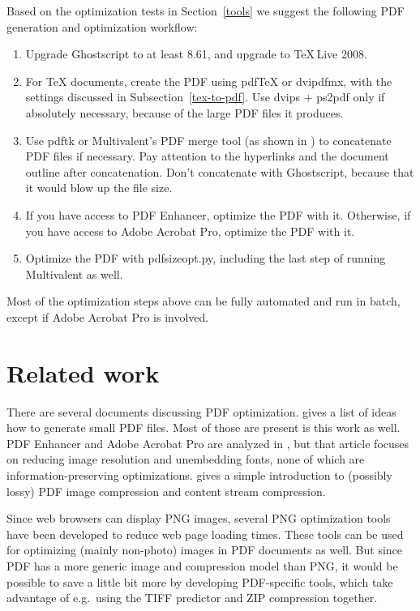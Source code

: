 \documentclass{ltugproc}
\def\cmd{\textsf}
\begin{document}
Based on the optimization tests in Section~\ref{tools} we suggest the
following PDF generation and optimization workflow:

\begin{enumerate}

\item Upgrade Ghostscript to at least 8.61, and upgrade to \TeX\,Live 2008.

\item For \TeX{} documents,
create the PDF using pdf\-\TeX{} or \cmd{dvipdfmx}, with the
settings discussed in Subsection~\ref{tex-to-pdf}. Use \cmd{dvips} $+$
\cmd{ps2pdf} only if absolutely necessary, because of the large PDF files it
produces.

\item Use \cmd{pdftk} or Multivalent's PDF merge tool (as shown in
\cite{pdf-concatenate}) to concatenate PDF files if necessary. Pay attention
to the hyperlinks and the document outline after concatenation. Don't
concatenate with Ghostscript, because that it would blow up the file size.

\item If you have access to PDF Enhancer, optimize the PDF with it. Otherwise,
if you have access to Adobe Acrobat Pro, optimize the PDF with it.

\item Optimize the PDF with \cmd{pdfsizeopt.py}, including the last step of
running Multivalent as well.

\end{enumerate}

\noindent
Most of the optimization steps above can be fully automated and run in
batch, except if Adobe Acrobat Pro is involved.

\section{Related work}\label{related-work}

There are several documents discussing PDF optimization.
\cite{pdf-bestpractices} gives a list of ideas how to generate small PDF
files. Most of those are present is this work as well.
PDF Enhancer and Adobe Acrobat Pro are analyzed in \cite{pdftweak},
but that article focuses on reducing image resolution and unembedding fonts,
none of which are information-preserving optimizations.
\cite{compressing-your} gives a simple introduction to (possibly lossy)
PDF image compression and content stream compression.

Since web browsers can display PNG images, several PNG optimization tools
\cite{png-recompressors,optipng,pngout} have been developed to reduce web
page loading times. These tools can be used for optimizing (mainly
non-photo) images in PDF documents as well. But since PDF has a more generic
image and compression model than PNG, it would be possible to save a little
bit more by developing PDF-specific tools, which take advantage of e.g.\
using the TIFF predictor and ZIP compression together.
\end{document}
